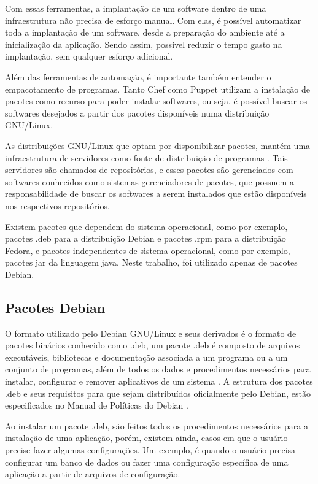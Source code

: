 Com essas ferramentas, a implantação de um software dentro de uma infraestrutura
não precisa de  esforço manual. Com elas, é possível automatizar toda a implantação
de um software, desde a preparação do ambiente até a inicialização da aplicação. 
Sendo assim, possível reduzir o tempo gasto na implantação, sem qualquer esforço
adicional.

Além das ferramentas de automação, é importante também entender o empacotamento de
programas. Tanto Chef como Puppet utilizam a instalação de pacotes como recurso para
poder instalar softwares, ou seja, é possível buscar os softwares desejados a partir
dos pacotes disponíveis numa distribuição GNU/Linux. 

As distribuições GNU/Linux que
optam por disponibilizar pacotes, mantém uma infraestrutura de servidores como fonte
de distribuição de programas \cite{araujo2011apprecommender}. Tais servidores são
chamados de repositórios, e esses pacotes são gerenciados com softwares conhecidos
como sistemas gerenciadores de pacotes, que possuem a responsabilidade de buscar
os softwares a serem instalados que estão disponíveis nos respectivos repositórios.

Existem pacotes que dependem do sistema operacional, como por exemplo, pacotes .deb
para a distribuição Debian e pacotes .rpm para a distribuição Fedora, e
pacotes independentes de sistema operacional, como por exemplo, pacotes jar da
linguagem java. Neste trabalho, foi utilizado apenas de pacotes Debian.


\subsection{Pacotes Debian}

O formato utilizado pelo Debian GNU/Linux e seus derivados é o formato de pacotes
binários conhecido como .deb, um pacote .deb é composto de arquivos executáveis,
bibliotecas e documentação associada a um programa ou a um conjunto de programas,
além de todos os dados e procedimentos necessários para instalar, configurar e remover
aplicativos de um sistema \cite{araujo2011apprecommender}. A estrutura dos pacotes 
.deb e seus requisitos para que sejam distribuídos oficialmente pelo Debian,
estão especificados no Manual de Políticas do Debian \cite{debian}.

Ao instalar um pacote .deb, são feitos todos os procedimentos necessários para a instalação
de uma aplicação, porém, existem ainda, casos em que o usuário precise fazer algumas
configurações. Um exemplo, é quando o usuário precisa configurar um banco de dados
ou fazer uma configuração específica de uma aplicação a partir de arquivos de configuração.

